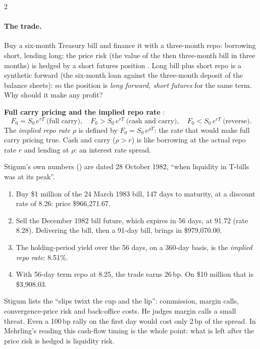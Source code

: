 \begin{paracol}{2}
\paragraph{The trade.} Buy a six-month Treasury bill and finance it with a three-month repo: borrowing short, lending long; the price risk (the value of the then
three-month bill in three months) is hedged by a short futures position .
Long bill plus short repo is a synthetic forward (the six-month loan against the three-month deposit of the balance sheets): so the position is \emph{long forward,
short futures} for the same term. Why should it make any profit? 

\begin{nfigure}
\begin{taccts}
\end{taccts}
\caption{Stigum's cash and carry: long positions above, short positions below the line in class; long bill $+$ short repo $=$ synthetic long forward
.}\label{fig:ff-cc}
\end{nfigure}

\begin{keyformulas}
\textbf{Full carry pricing and the implied repo rate} :
\[
  F_0 = S_0\,e^{rT}\ \text{(full carry)}, \quad F_0 > S_0\,e^{rT}\ \text{(cash and carry)}, \quad F_0 < S_0\,e^{rT}\ \text{(reverse).}
\]
The \emph{implied repo rate} $\rho$ is defined by $F_0 = S_0\,e^{\rho T}$: the rate that would make full carry pricing true. Cash and carry ($\rho>r$) is like
borrowing at the actual repo rate $r$ and lending at $\rho$: an interest rate spread.
\end{keyformulas}

\begin{reading}
Stigum's own numbers () are dated 28 October 1982, ``when liquidity in T-bills was at its peak''.
\begin{enumerate}
  \item Buy \$1 million of the 24 March 1983 bill, 147 days to maturity, at a discount rate of 8.26: price \$966{,}271.67.
  \item Sell the December 1982 bill future, which expires in 56 days, at 91.72 (rate 8.28). Delivering the bill, then a 91-day bill, brings in \$979{,}070.00.
  \item The holding-period yield over the 56 days, on a 360-day basis, is the \emph{implied repo rate}: 8.51\%.
  \item With 56-day term repo at 8.25, the trade earns 26\,bp. On \$10 million that is \$3{,}908.03.
\end{enumerate}
Stigum lists the ``slips twixt the cup and the lip'': commission, margin calls, convergence-price risk and back-office costs. He judges margin calls a small threat. Even a 100\,bp rally on the first day would cost only 2\textonequarter\,bp of the spread. In Mehrling's reading this cash-flow timing is the whole point: what is left after the price risk is hedged is liquidity risk.


\end{reading}
\end{paracol}
